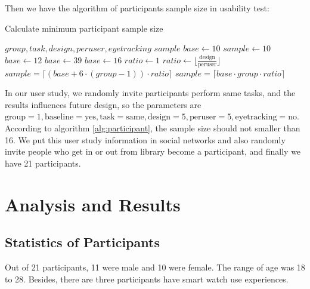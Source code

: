 Then we have the algorithm of participants sample size in usability test:

\begin{algorithm}[H]
\caption{Calculate minimum participant sample size}
\label{alg:participant}
\begin{algorithmic}
\REQUIRE $group, task, design, peruser, eyetracking$
\ENSURE $sample$
\STATE $base \leftarrow 10$
\STATE $sample \leftarrow 10$
\STATE $base \leftarrow 12$
\STATE $base \leftarrow 39$
\ENDIF
{}
\STATE $base \leftarrow 16$
\ENDIF
{}
\STATE $ratio \leftarrow 1$
\ELSE
\STATE $ratio \leftarrow \lfloor\frac{\text{design}}{\text{peruser}}\rfloor$
\ENDIF
{}
    \STATE $sample = \lceil (base + 6 \cdot (group - 1)) \cdot ratio \rceil$
\ELSE
    \STATE $sample = \lceil base \cdot group \cdot ratio \rceil$
\ENDIF
\end{algorithmic}
\end{algorithm}

In our user study, we randomly invite participants perform same tasks, and the results influences future design, so the parameters are $\text{group}=1, \text{baseline}=\text{yes}, \text{task}=\text{same}, \text{design}=5, \text{peruser}=5, \text{eyetracking}=\text{no}$. According to algorithm \ref{alg:participant}, the sample size should not smaller than 16. We put this user study information in social networks and also randomly invite people who get in or out from library become a participant, and finally we have 21 participants.

\section{Analysis and Results}

\subsection{Statistics of Participants}

Out of 21 participants, 11 were male and 10 were female. The range of age was 18 to 28. Besides, there are three participants have smart watch use experiences.

